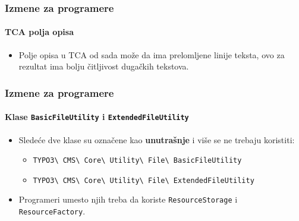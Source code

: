 
\begin{frame}[fragile]
	\frametitle{Izmene za programere}
	\framesubtitle{TCA polja opisa}

	\begin{itemize}
		\item Polje opisa u TCA od sada može da ima prelomljene linije teksta,
			ovo za rezultat ima bolju čitljivost dugačkih tekstova.
	\end{itemize}

\end{frame}


\begin{frame}[fragile]
	\frametitle{Izmene za programere}
	\framesubtitle{Klase \texttt{BasicFileUtility} i \texttt{ExtendedFileUtility}}

	\begin{itemize}
		\item Sledeće dve klase su označene kao \textbf{unutrašnje}
			i više se ne trebaju koristiti:

			\begin{itemize}\small
				\item \texttt{TYPO3\textbackslash
					CMS\textbackslash
					Core\textbackslash
					Utility\textbackslash
					File\textbackslash
					BasicFileUtility}
				\item \texttt{TYPO3\textbackslash
					CMS\textbackslash
					Core\textbackslash
					Utility\textbackslash
					File\textbackslash
					ExtendedFileUtility}
			\end{itemize}

		\item Programeri umesto njih treba da koriste \texttt{ResourceStorage}
			i \texttt{ResourceFactory}.

	\end{itemize}

\end{frame}


